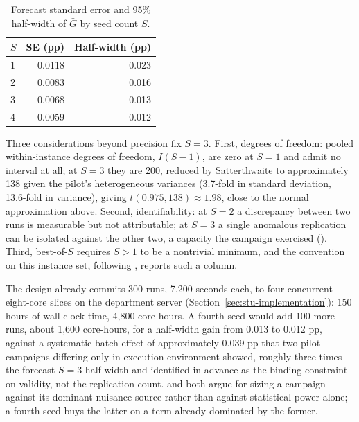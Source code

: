 \begin{table}[htbp]
\centering
\caption{Forecast standard error and 95\% half-width of $\bar G$ by seed count $S$.}\label{tab:seed-sizing}
\begin{tabular}{@{}lrr@{}}
\toprule
$S$ & SE (pp) & Half-width (pp) \\
\midrule
1 & 0.0118 & 0.023 \\
2 & 0.0083 & 0.016 \\
3 & 0.0068 & 0.013 \\
4 & 0.0059 & 0.012 \\
\bottomrule
\end{tabular}
\end{table}

Three considerations beyond precision fix $S=3$. First, degrees of freedom: pooled within-instance degrees of freedom, $I(S-1)$, are zero at $S=1$ and admit no interval at all; at $S=3$ they are 200, reduced by Satterthwaite to approximately 138 given the pilot's heterogeneous variances (3.7-fold in standard deviation, 13.6-fold in variance), giving $t(0.975,138)\approx1.98$, close to the normal approximation above. Second, identifiability: at $S=2$ a discrepancy between two runs is measurable but not attributable; at $S=3$ a single anomalous replication can be isolated against the other two, a capacity the campaign exercised (). Third, best-of-$S$ requires $S>1$ to be a nontrivial minimum, and the convention on this instance set, following \citet{queirogaXLInstancesCapacitated2026}, reports such a column.

The design already commits 300 runs, 7{,}200 seconds each, to four concurrent eight-core slices on the department server (Section~\ref{sec:stu-implementation}): 150 hours of wall-clock time, 4{,}800 core-hours. A fourth seed would add 100 more runs, about 1{,}600 core-hours, for a half-width gain from 0.013 to 0.012 pp, against a systematic batch effect of approximately 0.039 pp that two pilot campaigns differing only in execution environment showed, roughly three times the forecast $S=3$ half-width and identified in advance as the binding constraint on validity, not the replication count. \citet{johnsonTheoreticiansGuideExperimental2002} and \citet{barrDesigningReportingComputational1995} both argue for sizing a campaign against its dominant nuisance source rather than against statistical power alone; a fourth seed buys the latter on a term already dominated by the former.

